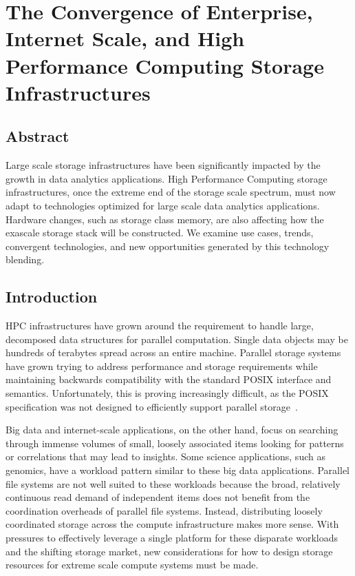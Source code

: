 
\chapter{The Convergence of Enterprise, Internet Scale, and High Performance
             Computing Storage Infrastructures}

\section*{Abstract}
Large scale storage infrastructures have been significantly impacted by the
growth in data analytics applications. High Performance Computing storage
infrastructures, once the extreme end of the storage scale spectrum, must now
adapt to technologies optimized for large scale data analytics applications.
Hardware changes, such as storage class memory, are also affecting how
the exascale storage stack will be constructed. We examine use cases, trends,
convergent technologies, and new opportunities generated by this technology
blending.

\section{Introduction}\label{sec:intro}
HPC infrastructures have grown around the requirement to handle large,
decomposed data structures for parallel computation. Single data objects may be
hundreds of terabytes spread across an entire machine. Parallel storage systems
have grown trying to address performance and storage requirements while
maintaining backwards compatibility with the standard POSIX interface and
semantics.  Unfortunately, this is proving increasingly difficult, as the POSIX
specification was not designed to efficiently support parallel
storage~\cite{kimpe:2014:storagemodels}.

Big data and internet-scale applications, on the other hand, focus on searching
through immense volumes of small, loosely associated items looking for patterns
or correlations that may lead to insights. Some science applications, such as
genomics, have a workload pattern similar to these big data
applications. Parallel file systems are not well suited to these workloads
because the broad, relatively continuous read demand of independent items does
not benefit from the coordination overheads of parallel file systems. Instead,
distributing loosely coordinated storage across the compute infrastructure makes
more sense. With pressures to effectively leverage a single platform for these
disparate workloads and the shifting storage market, new considerations for how
to design storage resources for extreme scale compute systems must be made.

